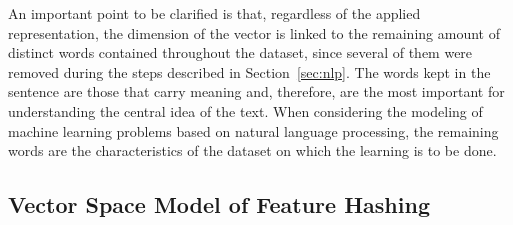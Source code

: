 \documentclass{ieeeaccess}
\begin{document}

An important point to be clarified is that, regardless of the applied representation, the dimension of the vector is linked to the remaining amount of distinct words contained throughout the dataset, since several of them were removed during the steps described in Section~\ref{sec:nlp}. The words kept in the sentence are those that carry meaning and, therefore, are the most important for understanding the central idea of the text. When considering the modeling of machine learning problems based on natural language processing, the remaining words are the characteristics of the dataset on which the learning is to be done.


\subsection {Vector Space Model of Feature Hashing}
\end{document}
